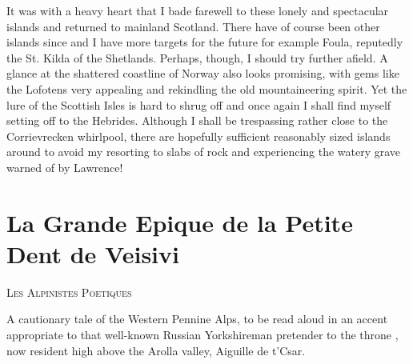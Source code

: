 \documentclass[a5paper,openany,font 10pt]{scrbook}
\makeatletter
\newcommand{\chapterauthor}[1]{%
{\parindent0pt\vspace*{-5pt}%
\linespread{1.1}\large\scshape#1%
\par\nobreak\vspace*{35pt}}
\@afterheading%
}
\makeatother
\begin{document}
It was with a heavy heart that I bade farewell to these lonely and
spectacular islands and returned to mainland Scotland.  There have of
course been other islands since and I have more targets for the future
for example Foula, reputedly the St.  Kilda of the Shetlands. Perhaps,
though, I should try further afield. A glance at the shattered
coastline of Norway also looks promising, with gems like the Lofotens
very appealing and rekindling the old mountaineering spirit. Yet the
lure of the Scottish Isles is hard to shrug off and once again I shall
find myself setting off to the Hebrides. Although I shall be
trespassing rather close to the Corrievrecken whirlpool, there are
hopefully sufficient reasonably sized islands around to avoid my
resorting to slabs of rock and experiencing the watery grave warned of
by Lawrence!

\chapter{La Grande Epique de la Petite Dent de Veisivi}
\label{sec:orgd414c7f}
\chapterauthor{Les Alpinistes Poetiques}

A cautionary tale of the Western Pennine Alps, to be read
aloud in an accent appropriate to that well-known Russian
Yorkshireman  pretender to the throne , now resident high
above the Arolla valley, Aiguille de t'Csar.
\end{document}
